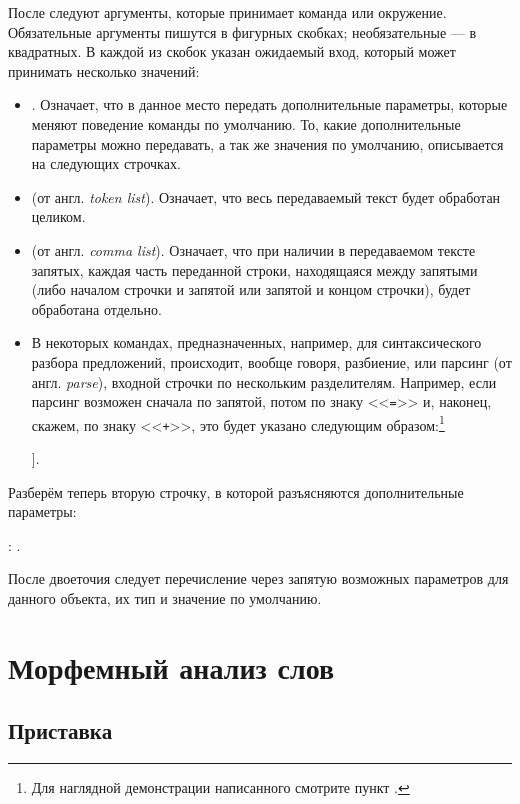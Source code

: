 После следуют аргументы, которые принимает команда или окружение. Обязательные аргументы пишутся в фигурных скобках; необязательные --- в квадратных. В каждой из скобок указан ожидаемый вход, который может принимать несколько значений:
\begin{itemize}
    \item \rsOptionsAux. Означает, что в данное место передать дополнительные параметры, которые меняют поведение команды по умолчанию. То, какие дополнительные параметры можно передавать, а так же значения по умолчанию, описывается на следующих строчках.
    \item \rsArgAux[tl]\space (от англ. \textit{token list}). Означает, что весь передаваемый текст будет обработан целиком.
    \item \rsArgAux\space (от англ. \textit{comma list}). Означает, что при наличии в передаваемом тексте запятых, каждая часть переданной строки, находящаяся между запятыми (либо началом строчки и запятой или запятой и концом строчки), будет обработана отдельно.
    \item В некоторых командах, предназначенных, например, для синтаксического разбора предложений, происходит, вообще говоря, разбиение, или парсинг (от англ. \textit{parse}), входной строчки по нескольким разделителям. Например, если парсинг возможен сначала по запятой, потом по знаку <<\texttt{=}>> и, наконец, скажем, по знаку <<\texttt{+}>>, это будет указано следующим образом:\footnote{Для наглядной демонстрации написанного смотрите пункт .}
    \begin{center}
        \rsArgAux[clist][[=, +]].
    \end{center}
\end{itemize}


Разберём теперь вторую строчку, в которой разъясняются дополнительные параметры:
\begin{center}
    \rsOptionsAux: . 
\end{center}

После двоеточия следует перечисление через запятую возможных параметров для данного объекта, их тип и значение по умолчанию.



\section{Морфемный анализ слов} 

\subsection{Приставка}

